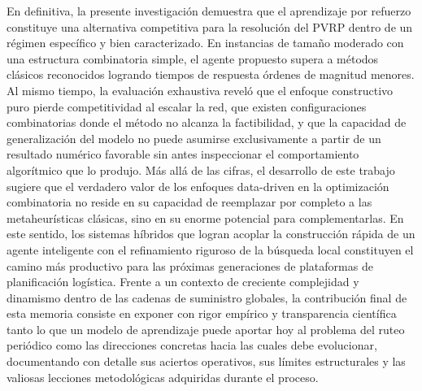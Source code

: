 En definitiva, la presente investigación demuestra que el aprendizaje por refuerzo constituye una alternativa competitiva para la resolución del PVRP dentro de un régimen específico y bien caracterizado. En instancias de tamaño moderado con una estructura combinatoria simple, el agente propuesto supera a métodos clásicos reconocidos logrando tiempos de respuesta órdenes de magnitud menores. Al mismo tiempo, la evaluación exhaustiva reveló que el enfoque constructivo puro pierde competitividad al escalar la red, que existen configuraciones combinatorias donde el método no alcanza la factibilidad, y que la capacidad de generalización del modelo no puede asumirse exclusivamente a partir de un resultado numérico favorable sin antes inspeccionar el comportamiento algorítmico que lo produjo. Más allá de las cifras, el desarrollo de este trabajo sugiere que el verdadero valor de los enfoques data-driven en la optimización combinatoria no reside en su capacidad de reemplazar por completo a las metaheurísticas clásicas, sino en su enorme potencial para complementarlas. En este sentido, los sistemas híbridos que logran acoplar la construcción rápida de un agente inteligente con el refinamiento riguroso de la búsqueda local constituyen el camino más productivo para las próximas generaciones de plataformas de planificación logística. Frente a un contexto de creciente complejidad y dinamismo dentro de las cadenas de suministro globales, la contribución final de esta memoria consiste en exponer con rigor empírico y transparencia científica tanto lo que un modelo de aprendizaje puede aportar hoy al problema del ruteo periódico como las direcciones concretas hacia las cuales debe evolucionar, documentando con detalle sus aciertos operativos, sus límites estructurales y las valiosas lecciones metodológicas adquiridas durante el proceso.